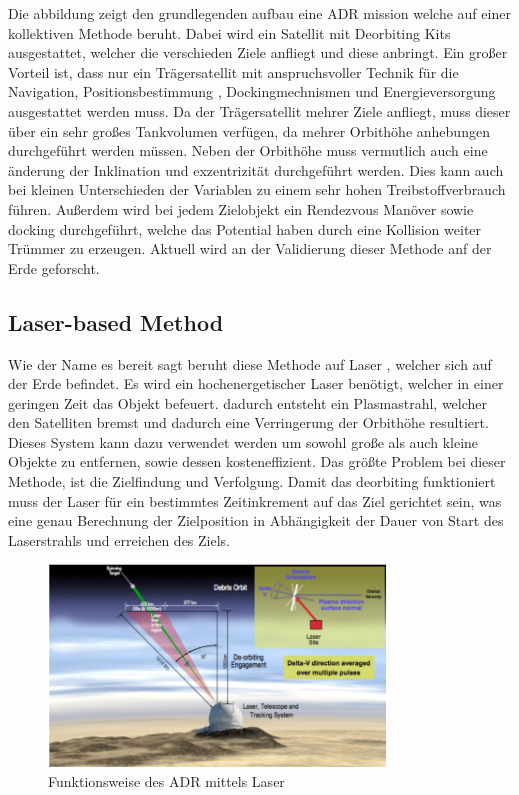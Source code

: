 Die abbildung zeigt den grundlegenden aufbau eine ADR mission welche auf einer kollektiven Methode beruht. Dabei wird ein Satellit mit Deorbiting Kits ausgestattet, welcher die verschieden Ziele anfliegt und diese anbringt. Ein großer Vorteil ist, dass nur ein Trägersatellit mit anspruchsvoller Technik für die Navigation, Positionsbestimmung , Dockingmechnismen und Energieversorgung ausgestattet werden muss. Da der Trägersatellit mehrer Ziele anfliegt, muss dieser über ein sehr großes Tankvolumen verfügen, da mehrer Orbithöhe anhebungen durchgeführt werden müssen. Neben der Orbithöhe muss vermutlich auch eine änderung der Inklination und exzentrizität durchgeführt werden. Dies kann auch bei kleinen Unterschieden der Variablen zu einem sehr hohen Treibstoffverbrauch führen. Außerdem wird bei jedem Zielobjekt ein Rendezvous Manöver sowie docking durchgeführt, welche das Potential haben durch eine Kollision weiter Trümmer zu erzeugen. Aktuell wird an der Validierung dieser Methode anf der Erde geforscht.

			\subsection{Laser-based Method}
Wie der Name es bereit sagt beruht diese Methode auf Laser , welcher sich auf der Erde befindet. Es wird ein hochenergetischer Laser benötigt, welcher in einer geringen Zeit das Objekt befeuert. dadurch entsteht ein Plasmastrahl, welcher den Satelliten bremst und dadurch eine Verringerung der Orbithöhe resultiert. Dieses System kann dazu verwendet werden um sowohl große als auch kleine Objekte zu entfernen, sowie dessen kosteneffizient. Das größte Problem bei dieser Methode, ist die Zielfindung und Verfolgung. Damit das deorbiting funktioniert muss der Laser für ein bestimmtes Zeitinkrement auf das Ziel gerichtet sein, was eine genau Berechnung der Zielposition in Abhängigkeit der Dauer von Start des Laserstrahls und erreichen des Ziels.
	
	\begin{figure}[h]
			\centering
					\includegraphics[width=0.80\textwidth]{./graphics/ADR/Laser-beam.PNG}
				\caption{Funktionsweise des ADR mittels Laser}
				\label{fig:Laser}
			\end{figure}

